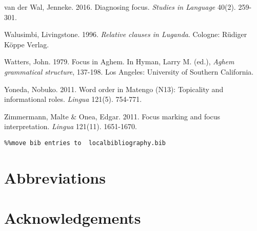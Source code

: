 \documentclass[output=paper]{langsci/langscibook}
\begin{document}
van der Wal, Jenneke. 2016. Diagnosing focus. \textit{Studies in Language} 40(2). 259-301.

Walusimbi, Livingstone. 1996. \textit{Relative clauses in Luganda}. Cologne: Rüdiger Köppe Verlag.

Watters, John. 1979. Focus in Aghem. In Hyman, Larry M. (ed.), \textit{Aghem grammatical structure}, 137-198. Los Angeles: University of Southern California.

Yoneda, Nobuko. 2011. Word order in Matengo (N13): Topicality and informational roles. \textit{Lingua} 121(5). 754-771.

Zimmermann, Malte \& Onea, Edgar. 2011. Focus marking and focus interpretation. \textit{Lingua} 121(11). 1651-1670.


\begin{verbatim}%%move bib entries to  localbibliography.bib
\end{verbatim}

\section*{Abbreviations}
\section*{Acknowledgements}

\printbibliography[heading=subbibliography,notkeyword=this]
\end{document}
